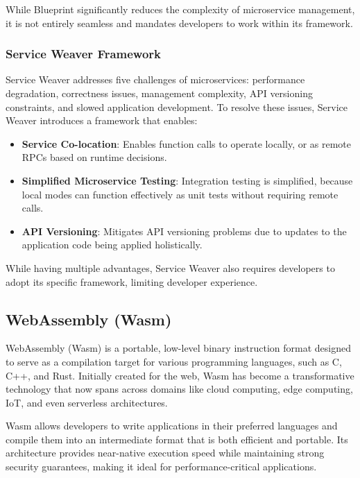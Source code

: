 While Blueprint significantly reduces the complexity of microservice management, it is not entirely seamless and mandates developers to work within its framework.

\subsubsection{Service Weaver Framework}
Service Weaver\cite{ghemawat2023towards} addresses five challenges of microservices: performance degradation, correctness issues, management complexity, API versioning constraints, and slowed application development. To resolve these issues, Service Weaver introduces a framework that enables:

\begin{itemize}
    \item \textbf{Service Co-location}: Enables function calls to operate locally, or as remote RPCs based on runtime decisions.
    \item \textbf{Simplified Microservice Testing}: Integration testing is simplified, because local modes can function effectively as unit tests without requiring remote calls.
    \item \textbf{API Versioning}: Mitigates API versioning problems due to updates to the application code being applied holistically.
\end{itemize}

While having multiple advantages, Service Weaver \cite{ghemawat2023towards} also requires developers to adopt its specific framework, limiting developer experience.

\subsection{WebAssembly (Wasm)}
WebAssembly (Wasm) is a portable, low-level binary instruction format designed to serve as a compilation target for various programming languages, such as C, C++, and Rust. Initially created for the web, Wasm has become a transformative technology that now spans across domains like cloud computing, edge computing, IoT, and even serverless architectures.

Wasm allows developers to write applications in their preferred languages and compile them into an intermediate format that is both efficient and portable. Its architecture provides near-native execution speed while maintaining strong security guarantees, making it ideal for performance-critical applications.

